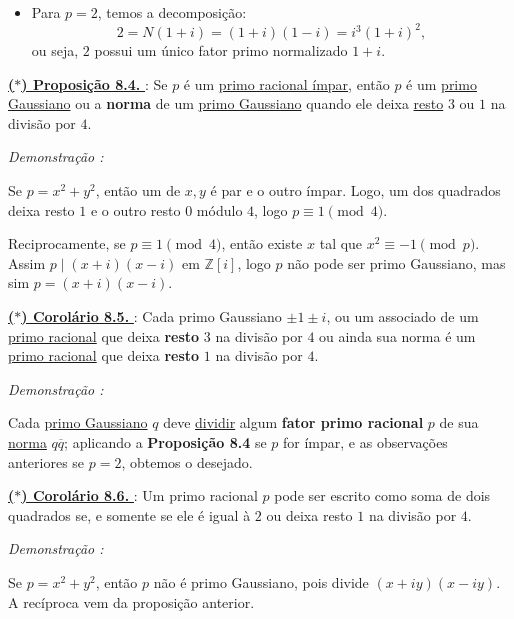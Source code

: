     \begin{itemize}[left=0.5cm, align=left, nosep]
        \item Para $p=2$, temos a decomposição:
            \[
            2 = N(1+i) = (1+i)(1-i) = i^3 (1+i)^2,
            \]
        ou seja, $2$ possui um único fator primo normalizado $1+i$.
    \end{itemize}

    \underline{\underline{ \textbf{\textcolor{cinzaEscuro}{($\ast$) Proposição 8.4.}} }} : Se $p$ é um \underline{primo racional ímpar}, então $p$ é um \underline{primo Gaussiano} ou 
    a \textbf{norma} de um \underline{primo Gaussiano} quando ele deixa \underline{resto} $3$ ou $1$ na divisão por $4$.

    \noindent\textit{Demonstração : }

    Se $p = x^2 + y^2$, então um de $x,y$ é par e o outro ímpar.  
    Logo, um dos quadrados deixa resto $1$ e o outro resto $0$ módulo $4$, logo $p\equiv 1 \pmod{4}$.  

    Reciprocamente, se $p\equiv 1 \pmod{4}$, então existe $x$ tal que $x^2 \equiv -1 \pmod{p}$.  
    Assim $p \mid (x+i)(x-i)$ em $\mathbb{Z}[i]$, logo $p$ não pode ser primo Gaussiano, mas sim $p = (x+i)(x-i)$.

    \underline{\underline{ \textbf{\textcolor{cinzaEscuro}{($\ast$) Corolário 8.5.}} }} : Cada primo Gaussiano  $\pm 1 \pm i$, ou um associado de um 
    \underline{primo racional} que deixa \textbf{resto} $3$ na divisão por $4$ ou ainda sua norma é um \underline{primo racional} que deixa 
    \textbf{resto} $1$ na divisão por $4$.

    \noindent\textit{Demonstração : }

    Cada \underline{primo Gaussiano} $q$ deve \underline{dividir} algum \textbf{fator primo racional} $p$ de sua \underline{norma} $q \overline{q}$;
    aplicando a \textbf{Proposição 8.4} se $p$ for ímpar, e as observações anteriores se $p = 2$, obtemos o desejado.

    \underline{\underline{ \textbf{\textcolor{cinzaEscuro}{($\ast$) Corolário 8.6.}} }} : Um primo racional $p$ pode ser escrito como soma de dois quadrados 
    se, e somente se ele é igual à $2$ ou deixa resto $1$ na divisão por $4$.

    \noindent\textit{Demonstração : }

    Se $p=x^2+y^2$, então $p$ não é primo Gaussiano, pois divide $(x+iy)(x-iy)$.  
    A recíproca vem da proposição anterior.
